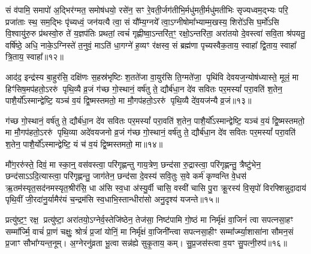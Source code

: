 {\anuvakamend[{चक्षु॑र॒ष्टाच॑त्वारिꣳशच्च। (7)}]}

सं व॑पामि॒ समापो॑ अ॒द्भिर॑ग्मत॒ समोष॑धयो॒ रसे॑न॒ सꣳ रे॒वती॒र्जग॑तीभि॒र्मधु॑मती॒र्मधु॑मतीभिः सृज्यध्वम॒द्भ्यः परि॒ प्रजा॑ताः स्थ॒ सम॒द्भिः पृ॑च्यध्वं॒ जन॑यत्यै त्वा॒ सं यौ᳚म्य॒ग्नये᳚ त्वा॒\-ऽग्नीषोमा᳚भ्याम्म॒खस्य॒ शिरो॑\-ऽसि घ॒र्मो॑\-ऽसि वि॒श्वायु॑रु॒रु प्र॑थस्वो॒रु ते॑ य॒ज्ञप॑तिः प्रथतां॒ त्वचं॑ गृह्णीष्वा॒\-ऽन्तरि॑त॒ꣳ॒ रक्षो॒\-ऽन्तरि॑ता॒ अरा॑तयो दे॒वस्त्वा॑ सवि॒ता श्र॑पयतु॒ वर्\mbox{}षि॑ष्ठे॒ अधि॒ नाके॒\-ऽग्निस्ते॑ त॒नुवं॒ मा\-ऽति॑ धा॒गग्ने॑ ह॒व्यꣳ र॑क्षस्व॒ सं ब्रह्म॑णा पृच्यस्वैक॒ताय॒ स्वाहा᳚ द्वि॒ताय॒ स्वाहा᳚ त्रि॒ताय॒ स्वाहा᳚॥१२॥

{\anuvakamend[{स॒वि॒ता द्वाविꣳ॑शतिश्च। (8)}]}

आद॑द॒ इन्द्र॑स्य बा॒हुर॑सि॒ दक्षि॑णः स॒हस्र॑भृष्टिः श॒तते॑जा वा॒युर॑सि ति॒ग्मते॑जा॒ पृथि॑वि देवयज॒न्योष॑ध्यास्ते॒ मूलं॒ मा हिꣳ॑सिष॒मप॑हतो॒\-ऽररु॑ पृथि॒व्यै व्र॒जं ग॑च्छ गो॒स्थानं॒ वर्\mbox{}ष॑तु ते॒ द्यौर्ब॑धा॒न दे॑व सवितः पर॒मस्यां᳚ परा॒वति॑ श॒तेन॒ पाशै॒र्यो᳚\-ऽस्मान्द्वेष्टि॒ यञ्च॑ व॒यं द्वि॒ष्मस्तमतो॒ मा मौ॒गप॑हतो॒\-ऽररु॑ पृथि॒व्यै दे॑व॒यज॑न्यै व्र॒जं॥१३॥

ग॑च्छ गो॒स्थानं॒ वर्\mbox{}ष॑तु ते॒ द्यौर्ब॑धा॒न दे॑व सवितः पर॒मस्यां᳚ परा॒वति॑ श॒तेन॒ पाशै॒र्यो᳚\-ऽस्मान्द्वेष्टि॒ यञ्च॑ व॒यं द्वि॒ष्मस्तमतो॒ मा मौ॒गप॑हतो॒\-ऽररु॑ पृथि॒व्या अदे॑वयजनो व्र॒जं ग॑च्छ गो॒स्थानं॒ वर्\mbox{}ष॑तु ते॒ द्यौर्ब॑धा॒न दे॑व सवितः पर॒मस्यां᳚ परा॒वति॑ श॒तेन॒ पाशै॒र्यो᳚\-ऽस्मान्द्वेष्टि॒ यं च॑ व॒यं द्वि॒ष्मस्तमतो॒ मा॥१४॥

मौ॑ग॒ररु॑स्ते॒ दिवं॒ मा स्का॒न्॒ वस॑वस्त्वा॒ परि॑गृह्णन्तु गाय॒त्रेण॒ छन्द॑सा रु॒द्रास्त्वा॒ परि॑गृह्णन्तु॒ त्रैष्टु॑भेन॒ छन्द॑सा\-ऽ\-ऽदि॒त्यास्त्वा॒ परि॑गृह्णन्तु॒ जाग॑तेन॒ छन्द॑सा दे॒वस्य॑ सवि॒तुः स॒वे कर्म॑ कृण्वन्ति वे॒धस॑ ऋ॒तम॑स्यृत॒सद॑नमस्यृत॒श्रीर॑सि॒ धा अ॑सि स्व॒धा अ॑स्यु॒र्वी चासि॒ वस्वी॑ चासि पु॒रा क्रू॒रस्य॑ वि॒सृपो॑ विरफ्शिन्नुदा॒दाय॑ पृथि॒वीं जी॒रदा॑नु॒र्यामैर॑यं च॒न्द्रम॑सि स्व॒धाभि॒स्तान्धीरा॑सो अनु॒दृश्य॑ यजन्ते॥१५॥

{\anuvakamend[{दे॒व॒यज॑न्यै व्र॒जन्तमतो॒ मा वि॑रफ्शि॒न्नेका॑दश च। (9)}]}

प्रत्यु॑ष्ट॒ꣳ॒ रक्ष॒ प्रत्यु॑ष्टा॒ अरा॑तयो॒\-ऽग्नेर्व॒स्तेजि॑ष्ठेन॒ तेज॑सा॒ निष्ट॑पामि गो॒ष्ठं मा निर्मृ॑क्षं वा॒जिनं॑ त्वा सपत्नसा॒हꣳ सम्मा᳚र्ज्मि॒ वाचं॑ प्रा॒णं चक्षुः॒ श्रोत्रं॑ प्र॒जां योनिं॒ मा निर्मृ॑क्षं वा॒जिनी᳚न्त्वा सपत्नसा॒हीꣳ सम्मा᳚र्ज्म्या॒शासा॑ना सौमन॒सं प्र॒जाꣳ सौभा᳚ग्यन्त॒नूम्। अ॒ग्नेरनु॑व्रता भू॒त्वा सन्न॑ह्ये सुकृ॒ताय॒ कम्। सु॒प्र॒जस॑स्त्वा व॒यꣳ सु॒पत्नी॒रुप॑॥१६॥

